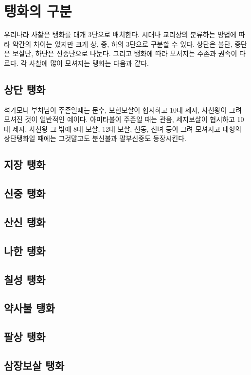 \documentclass[12pt, a4paper, oneside]{book}
\let\stdsection\section
\renewcommand\section{\newpage\stdsection}
\begin{document}
	\section{ 탱화의 구분 }


우리나라 사찰은 탱화를 대개 3단으로 배치한다.
시대나 교리상의 분류하는 방법에 따라 약간의 차이는 있지만 크게 상, 중, 하의 3단으로 구분할 수 있다.
상단은 불단, 중단은 보살단, 하단은 신중단으로 나눈다.
그리고 탱화에 따라 모셔지는 주존과 권속이 다르다.
각 사찰에 많이 모셔지는 탱화는 다음과 같다.

	\subsection{ 상단	탱화}

석가모니 부처님이 주존일때는 문수, 보현보살이 협시하고	
10대 제자, 사천왕이 그려 모셔진 것이 일반적인 예이다.	
아미타불이 주존일 때는 관음, 세지보살이 협시하고 10대 제자, 사천왕 그 밖에 8대 보살,	
12대 보살, 천동, 천녀 등이 그려 모셔지고 대형의 상단탱화일 때에는	
그것말고도 분신불과 팔부신중도 등장시킨다.	

	\subsection{ 지장	탱화}
	\subsection{ 신중	탱화}
	\subsection{ 산신	탱화}
	\subsection{ 나한	탱화}
	\subsection{ 칠성	탱화}
	\subsection{ 약사불	탱화}
	\subsection{ 팔상	탱화}
	\subsection{ 삼장보살	탱화}
\end{document}
